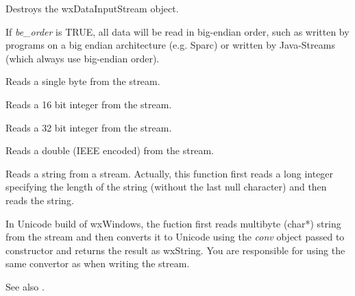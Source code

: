 




Destroys the wxDataInputStream object.



If {\it be\_order} is TRUE, all data will be read in big-endian
order, such as written by programs on a big endian architecture 
(e.g. Sparc) or written by Java-Streams (which always use 
big-endian order).
  


Reads a single byte from the stream.



Reads a 16 bit integer from the stream.



Reads a 32 bit integer from the stream.



Reads a double (IEEE encoded) from the stream.

\label{wxdatainputstreamreadstring}


Reads a string from a stream. Actually, this function first reads a long 
integer specifying the length of the string (without the last null character) 
and then reads the string.

In Unicode build of wxWindows, the fuction first reads multibyte (char*)
string from the stream and then converts it to Unicode using the {\it conv}
object passed to constructor and returns the result as wxString. You are
responsible for using the same convertor as when writing the stream.

See also .
